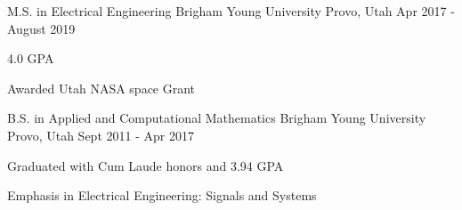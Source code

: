 

\begin{cventries}

  \cventry
    {M.S. in Electrical Engineering} %
    {Brigham Young University} %
    {Provo, Utah} %
    {Apr 2017 - August 2019} %
    {
      \begin{cvitems}
        \item {4.0 GPA}
        \item {Awarded Utah NASA space Grant}
      \end{cvitems}
    }

  \cventry
    {B.S. in Applied and Computational Mathematics} %
    {Brigham Young University} %
    {Provo, Utah} %
    {Sept 2011 - Apr 2017} %
    {
      \begin{cvitems} %
        \item {Graduated with Cum Laude honors and 3.94 GPA}
        \item {Emphasis in Electrical Engineering: Signals and Systems}
      \end{cvitems}
    }

\end{cventries}
